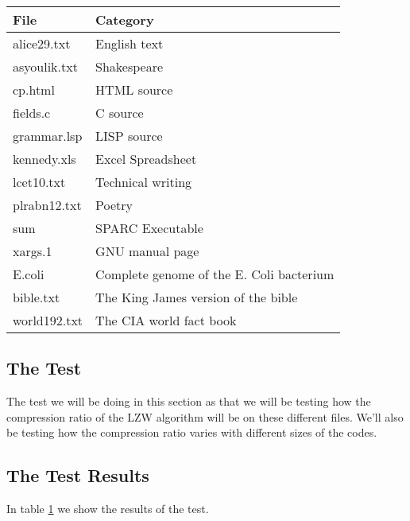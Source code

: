 \begin{refsection}
\begin{table}
  \centering
  \begin{tabular}{ll}
    \toprule
    File & Category \\
    \midrule
    alice29.txt & English text \\
    asyoulik.txt & Shakespeare \\
    cp.html & HTML source \\
    fields.c & C source \\
    grammar.lsp & LISP source \\
    kennedy.xls & Excel Spreadsheet \\
    lcet10.txt & Technical writing \\
    plrabn12.txt & Poetry \\
    sum & SPARC Executable \\
    xargs.1 & GNU manual page \\
    E.coli & Complete genome of the E. Coli bacterium \\
    bible.txt & The King James version of the bible \\
    world192.txt & The CIA world fact book \\
    \bottomrule
  \end{tabular}
  \caption{}
  \label{tab:corp-files}
\end{table}

\subsection{The Test}

The test we will be doing in this section as that we will be testing
how the compression ratio of the LZW algorithm will be on these
different files. We'll also be testing how the compression ratio
varies with different sizes of the codes.

\subsection{The Test Results}

In table \ref{tab:corp-files} we show the results of the test.


\end{refsection}

